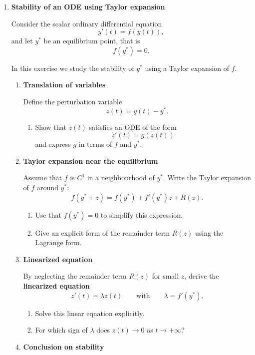 \documentclass[11pt]{article}
\begin{document}
\begin{enumerate}
\bigskip
\item \textbf{Stability of an ODE using Taylor expansion}

Consider the scalar ordinary differential equation
\[
y'(t)=f(y(t)),
\]
and let \(y^\ast\) be an equilibrium point, that is
\[
f(y^\ast)=0.
\]

In this exercise we study the stability of \(y^\ast\) using a Taylor expansion of \(f\).

\begin{enumerate}

\item \textbf{Translation of variables}

Define the perturbation variable
\[
z(t)=y(t)-y^\ast.
\]

\begin{enumerate}
\item Show that \(z(t)\) satisfies an ODE of the form
\[
z'(t)=g(z(t))
\]
and express \(g\) in terms of \(f\) and \(y^\ast\).
\end{enumerate}

\item \textbf{Taylor expansion near the equilibrium}

Assume that \(f\) is \(C^1\) in a neighbourhood of \(y^\ast\).  
Write the Taylor expansion of \(f\) around \(y^\ast\):
\[
f(y^\ast+z)= f(y^\ast)+ f'(y^\ast)z + R(z).
\]

\begin{enumerate}
\item Use that \(f(y^\ast)=0\) to simplify this expression.
\item Give an explicit form of the remainder term \(R(z)\) using the Lagrange form.
\end{enumerate}

\item \textbf{Linearized equation}

By neglecting the remainder term \(R(z)\) for small \(z\), derive the \textbf{linearized equation}
\[
z'(t)=\lambda z(t)
\qquad\text{with}\qquad \lambda=f'(y^\ast).
\]

\begin{enumerate}
\item Solve this linear equation explicitly.
\item For which sign of \(\lambda\) does \(z(t)\to 0\) as \(t\to+\infty\)?
\end{enumerate}

\item \textbf{Conclusion on stability}


\end{enumerate}
\end{enumerate}
\end{document}
